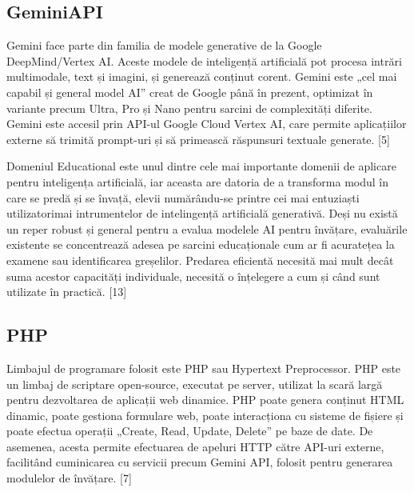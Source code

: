 \subsection{GeminiAPI}

Gemini face parte din familia de modele generative de la Google DeepMind/Vertex AI. Aceste modele de inteligență artificială pot procesa intrări multimodale, text și imagini, și generează
conținut corent. Gemini este „cel mai capabil și general model AI” creat de Google până în prezent, optimizat în variante precum Ultra, Pro și Nano pentru sarcini de complexități diferite. 
Gemini este accesil prin API-ul Google Cloud Vertex AI, care permite aplicațiilor externe să trimită prompt-uri și să primească răspunsuri textuale generate. [5]

Domeniul Educational este unul dintre cele mai importante domenii de aplicare pentru inteligența artificială, iar aceasta are datoria de a transforma modul în care se predă și se învață, 
elevii numărându-se printre cei mai entuziaști utilizatorimai intrumentelor de intelingență artificială generativă. Deși nu există un reper robust și general pentru a evalua modelele AI 
pentru învățare, evaluările existente se concentrează adesea pe sarcini educaționale cum ar fi acuratețea la examene sau identificarea greșelilor. Predarea eficientă necesită mai 
mult decât suma acestor capacități individuale, necesită o înțelegere a cum și când sunt utilizate în practică. [13] 

\subsection{PHP}

Limbajul de programare folosit este PHP sau Hypertext Preprocessor. PHP este un limbaj de scriptare open-source, executat pe server, utilizat la scară largă pentru dezvoltarea de aplicații 
web dinamice. PHP poate genera conținut HTML dinamic, poate gestiona formulare web, poate interacționa cu sisteme de fișiere și poate efectua operații „Create, Read, Update, Delete” pe baze 
de date. De asemenea, acesta permite efectuarea de apeluri HTTP către API-uri externe, facilitând cuminicarea cu servicii precum Gemini API, folosit pentru generarea modulelor de învățare. [7] 

